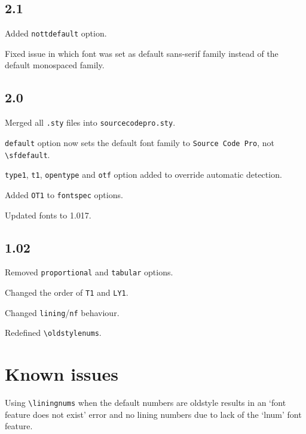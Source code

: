 \documentclass[11pt,a4paper,english]{article}
\begin{document}
\begin{multicols}{2}
\subsection*{2.1}
\begin{itemize*}
	\item Added \texttt{nottdefault} option.
	\item Fixed issue in which font was set as default sans-serif family instead of the default monospaced family.
\end{itemize*}

\subsection*{2.0}
\begin{itemize*}
	\item Merged all \texttt{.sty} files into \texttt{sourcecodepro.sty}.
	\item \texttt{default} option now sets the default font family to \texttt{Source Code Pro}, not \texttt{\textbackslash sfdefault}.
	\item \texttt{type1}, \texttt{t1}, \texttt{opentype} and \texttt{otf} option added to override automatic detection.
	\item Added \texttt{OT1} to \texttt{fontspec} options.
	\item Updated fonts to 1.017.
\end{itemize*}

\subsection*{1.02}
\begin{itemize*}
	\item Removed \texttt{proportional} and \texttt{tabular} options.
	\item Changed the order of \texttt{T1} and \texttt{LY1}.
	\item Changed \texttt{lining}/\texttt{nf} behaviour.
	\item Redefined \texttt{\textbackslash oldstylenums}.
\end{itemize*}

\section{Known issues}
\begin{itemize*}
	\item Using \texttt{\textbackslash liningnums} when the default numbers are oldstyle results in an ‘font feature does not exist’ error and no lining numbers due to lack of the ‘lnum’ font feature.
\end{itemize*}

\newpage
\end{multicols}
\end{document}
